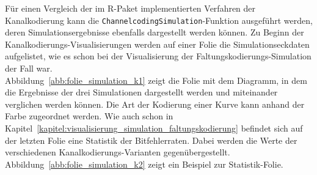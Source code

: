 Für einen Vergleich der im R-Paket implementierten Verfahren der Kanalkodierung kann die \texttt{ChannelcodingSimulation}-Funktion ausgeführt werden, deren Simulationsergebnisse ebenfalls dargestellt werden können. Zu Beginn der Kanalkodierungs-Visualisierungen werden auf einer Folie die Simulationseckdaten aufgelistet, wie es schon bei der Visualisierung der Faltungskodierungs-Simulation der Fall war.
\\
Abbildung~\ref{abb:folie_simulation_k1} zeigt die Folie mit dem Diagramm, in dem die Ergebnisse der drei Simulationen dargestellt werden und miteinander verglichen werden können. Die Art der Kodierung einer Kurve kann anhand der Farbe zugeordnet werden.
Wie auch schon in Kapitel~\ref{kapitel:visualisierung_simulation_faltungskodierung} befindet sich auf der letzten Folie eine Statistik der Bitfehlerraten. Dabei werden die Werte der verschiedenen Kanalkodierungs-Varianten gegenübergestellt. Abbildung~\ref{abb:folie_simulation_k2} zeigt ein Beispiel zur Statistik-Folie.
